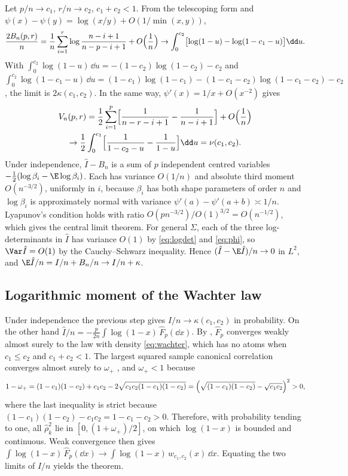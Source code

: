 Let $p/n\to c_1$, $r/n\to c_2$, $c_1+c_2<1$. From the telescoping form and $\psi(x)-\psi(y)=\log(x/y)+O(1/\min(x,y))$,
\[
 \frac{2B_n(p,r)}n=\frac1n\sum_{i=1}^r\log\frac{n-i+1}{n-p-i+1}+O\Bigl(\frac1n\Bigr)\to\int_0^{c_2}\bigl[\log(1-u)-\log(1-c_1-u)\bigr]\dd u.
\]
With $\int_0^{c_2}\log(1-u)\,\dd u=-(1-c_2)\log(1-c_2)-c_2$ and $\int_0^{c_2}\log(1-c_1-u)\,\dd u=(1-c_1)\log(1-c_1)-(1-c_1-c_2)\log(1-c_1-c_2)-c_2$, the limit is $2\kappa(c_1,c_2)$. In the same way, $\psi'(x)=1/x+O(x^{-2})$ gives
\begin{multline*}
 V_n(p,r)=\frac12\sum_{i=1}^p\Bigl[\frac1{n-r-i+1}-\frac1{n-i+1}\Bigr]+O\Bigl(\frac1n\Bigr)\\
 \to\frac12\int_0^{c_1}\Bigl[\frac1{1-c_2-u}-\frac1{1-u}\Bigr]\dd u=\nu(c_1,c_2).
\end{multline*}
Under independence, $\hat I-B_n$ is a sum of $p$ independent centred variables $-\tfrac12(\log\beta_i-\E\log\beta_i)$. Each has variance $O(1/n)$ and absolute third moment $O(n^{-3/2})$, uniformly in $i$, because $\beta_i$ has both shape parameters of order $n$ and $\log\beta_i$ is approximately normal with variance $\psi'(a)-\psi'(a+b)\asymp1/n$. Lyapunov's condition holds with ratio $O(pn^{-3/2})/O(1)^{3/2}=O(n^{-1/2})$, which gives the central limit theorem. For general $\Sigma$, each of the three log-determinants in $\hat I$ has variance $O(1)$ by \eqref{eq:logdet} and \eqref{eq:phi}, so $\Var\hat I=O(1)$ by the Cauchy--Schwarz inequality. Hence $(\hat I-\E\hat I)/n\to0$ in $L^2$, and $\E\hat I/n=I/n+B_n/n\to I/n+\kappa$.

\subsection*{Logarithmic moment of the Wachter law}

Under independence the previous step gives $\hat I/n\to\kappa(c_1,c_2)$ in probability. On the other hand $\hat I/n=-\tfrac p{2n}\int\log(1-x)\,\hat F_p(\dd x)$. By \citet{wachter1980limiting}, $\hat F_p$ converges weakly almost surely to the law with density \eqref{eq:wachter}, which has no atoms when $c_1\le c_2$ and $c_1+c_2<1$. The largest squared sample canonical correlation converges almost surely to $\omega_+$ \citep{johnstone2008multivariate,bao2019canonical}, and $\omega_+<1$ because
\[
 1-\omega_+=(1-c_1)(1-c_2)+c_1c_2-2\sqrt{c_1c_2(1-c_1)(1-c_2)}=\Bigl(\sqrt{(1-c_1)(1-c_2)}-\sqrt{c_1c_2}\Bigr)^2>0,
\]
where the last inequality is strict because $(1-c_1)(1-c_2)-c_1c_2=1-c_1-c_2>0$. Therefore, with probability tending to one, all $\hat\rho_k^2$ lie in $[0,(1+\omega_+)/2]$, on which $\log(1-x)$ is bounded and continuous. Weak convergence then gives $\int\log(1-x)\,\hat F_p(\dd x)\to\int\log(1-x)\,w_{c_1,c_2}(x)\,\dd x$. Equating the two limits of $\hat I/n$ yields the theorem.


